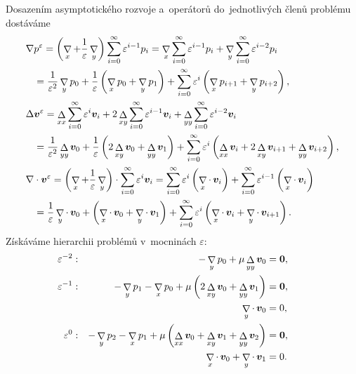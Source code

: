 Dosazením asymptotického rozvoje a~operátorů do~jednotlivých členů problému  dostáváme
\begin{subequations}
\begin{align}
\nabla
& p^{\varepsilon} 
    = \left(\mathop{\nabla}\limits_{x}+\frac{1}{\varepsilon}\mathop{\nabla}\limits_{y}\right)\sum_{i=0}^\infty \varepsilon^{i-1} p_i
    =\mathop{\nabla}\limits_{x}\sum_{i=0}^\infty \varepsilon^{i-1} p_i
    +\mathop{\nabla}\limits_{y}\sum_{i=0}^\infty \varepsilon^{i-2} p_i
\nonumber\\&
    =\frac{1}{\varepsilon^{2}}\mathop{\nabla}\limits_{y} p_0
    +\frac{1}{\varepsilon}\left(\mathop{\nabla}\limits_{x} p_0+\mathop{\nabla}\limits_{y} p_1\right)
    +\sum_{i=0}^{\infty}\varepsilon^i \left(\mathop{\nabla}\limits_{x} p_{i+1}+\mathop{\nabla}\limits_{y} p_{i+2}\right),
\\
\Delta
& \bm{v}^\varepsilon=
    \mathop{\Delta}\limits_{xx}\sum_{i=0}^\infty \varepsilon^i\bm{v}_i
    +2\mathop{\Delta}\limits_{xy}\sum_{i=0}^\infty \varepsilon^{i-1}\bm{v}_i
    +\mathop{\Delta}\limits_{yy}\sum_{i=0}^\infty \varepsilon^{i-2}\bm{v}_i
\nonumber\\&=
    \frac{1}{\varepsilon^{2}}\mathop{\Delta}\limits_{yy}\bm{v}_0+
    \frac{1}{\varepsilon}\left(2\mathop{\Delta}\limits_{xy}\bm{v}_0+\mathop{\Delta}\limits_{yy}\bm{v}_1\right)
    +\sum_{i=0}^{\infty}\varepsilon^{i}\left(\mathop{\Delta}\limits_{xx}\bm{v}_i+2\mathop{\Delta}\limits_{xy}\bm{v}_{i+1}+\mathop{\Delta}\limits_{yy}\bm{v}_{i+2}\right),
\\\nabla
&\cdot\bm{v}^{\varepsilon}=
    \left(\mathop{\nabla}\limits_{x}+\frac{1}{\varepsilon}\mathop{\nabla}\limits_{y}\right) \cdot 
    \sum_{i=0}^\infty \varepsilon^i\bm{v}_i
    =
    \sum_{i=0}^{\infty}\varepsilon^{i} \left(\mathop{\nabla}\limits_{x}\cdot\, \bm{v}_{i}\right)
    +\sum_{i=0}^{\infty} \varepsilon^{i-1} \left(\mathop{\nabla}\limits_{x} \cdot\, \bm{v}_{i}\right)
\nonumber\\&=
    \frac{1}{\varepsilon}\mathop{\nabla}\limits_{y}\cdot\, \bm{v}_0
    +\left(\mathop{\nabla}\limits_{x}\cdot\,\bm{v}_0+\mathop{\nabla}\limits_{y}\cdot\, \bm{v}_1\right)
    +\sum_{i=0}^{\infty}\varepsilon^{i}\left(\mathop{\nabla}\limits_{x}\cdot\,\bm{v}_{i}+\mathop{\nabla}\limits_{y}\cdot\,\bm{v}_{i+1}\right).
\end{align}
\end{subequations}
Získáváme hierarchii problémů v~mocninách $\varepsilon$:
\begin{subequations}
    \label{eq:permeability_stokes_hierarchy}
    \begin{align}
        \label{eq:permeability_stokes_hierarchy:1.1}
    \varepsilon^{-2}:   &&-\mathop{\nabla}\limits_{y} p_0 +\mu \mathop{\Delta}\limits_{yy} \bm{v}_0&=\bm{0},&&&&\\
        \label{eq:permeability_stokes_hierarchy:2.1}
    \varepsilon^{-1}:   &&-\mathop{\nabla}\limits_{y} p_1 -\mathop{\nabla}\limits_{x} p_0 + \mu\left(2\mathop{\Delta}\limits_{xy}\bm{v}_0+\mathop{\Delta}\limits_{yy}\bm{v}_1\right)&=\bm{0},\\
        \label{eq:permeability_stokes_hierarchy:2.2}
                        &&\mathop{\nabla}\limits_{y} \cdot\, \bm{v}_0&=0,\\
        \label{eq:permeability_stokes_hierarchy:3.1}
    \varepsilon^{0}:    &&-\mathop{\nabla}\limits_{y} p_2 -\mathop{\nabla}\limits_{x} p_1 + \mu\left(\mathop{\Delta}\limits_{xx}\bm{v}_0+\mathop{\Delta}\limits_{xy}\bm{v}_1+\mathop{\Delta}\limits_{yy}\bm{v}_2\right)&=\bm{0},\\
        \label{eq:permeability_stokes_hierarchy:3.2}
                        &&\mathop{\nabla}\limits_{x}\cdot\, \bm{v}_0+\mathop{\nabla}\limits_{y} \cdot\, \bm{v}_1 &= 0.
    \end{align}
\end{subequations}
